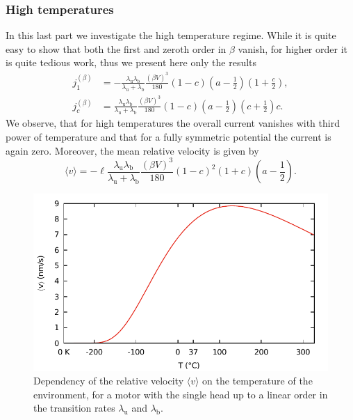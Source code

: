 \documentclass[aps,pre,twocolumn,showpacs,showkeys,superscriptaddress,floatfix]{revtex4-1}
\begin{document}
\subsubsection{High temperatures} 
In this last part we investigate the high temperature regime.
While it is quite easy to show that both the first and zeroth order in $\beta$ vanish, for higher order it is quite tedious work, thus we present here only the results
\begin{align*}
j_1^{(\beta)} &= - \frac{ \lambda_\text{u} \lambda_\text{b} }{ \lambda_\text{u} + \lambda_\text{b} } \frac{\left( \beta V \right)^3 }{180} (1-c) \left(a - \frac{1}{2} \right) \left( 1 + \frac{c}{2} \right), \\
j_c^{(\beta)} &= \frac{ \lambda_\text{u} \lambda_\text{b} }{ \lambda_\text{u} + \lambda_\text{b} } \frac{\left( \beta V \right)^3 }{180} (1-c) \left(a - \frac{1}{2} \right) \left( c + \frac{1}{2} \right) c.
\end{align*}
We observe, that for high temperatures the overall current vanishes with third power of temperature and that for a fully symmetric potential the current is again zero. 
Moreover, the mean relative velocity is given by 
\[
\langle v \rangle = - \ell \frac{ \lambda_\text{u} \lambda_\text{b} }{ \lambda_\text{u} + \lambda_\text{b} } \frac{\left( \beta V \right)^3 }{180} (1-c)^2 (1+c) \left(a - \frac{1}{2} \right) . 
\]

\begin{figure}[t]
\centering
\includegraphics[width=0.9\linewidth,height=!]{v_T_1head_analytic.pdf}
\caption{\label{fig:v_T_1head_analytic}
Dependency of the relative velocity $\langle v \rangle$ on the temperature of the environment, 
for a motor with the single head up to a linear order in the transition rates $\lambda_\text{u}$ and $\lambda_\text{b}$. 
}
\end{figure} 


\end{document}

